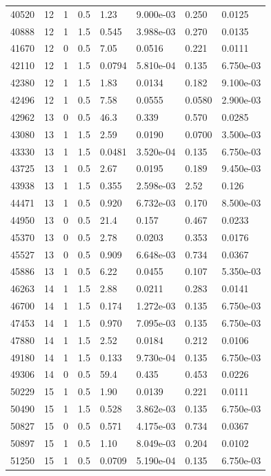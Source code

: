 \documentclass[preview]{standalone}
\begin{document}
{{{{\begin{tabular}{L{1.2cm}C{1.2cm} C{0.3cm}C{0.5cm} C{1.4cm}C{1.4cm} C{1.4cm}C{1.4cm}}
  40520  &    12  & 1     & 0.5 &  1.23  & 9.000e-03  & 0.250 &  0.0125   \\ 
  40888  &    12  & 1     & 1.5 &  0.545  & 3.988e-03  & 0.270 &  0.0135   \\ 
  41670  &    12  & 0     & 0.5 &  7.05  & 0.0516  & 0.221 &  0.0111   \\ 
  42110  &    12  & 1     & 1.5 &  0.0794  & 5.810e-04  & 0.135 &  6.750e-03   \\ 
  42380  &    12  & 1     & 1.5 &  1.83  & 0.0134  & 0.182 &  9.100e-03   \\ 
  42496  &    12  & 1     & 0.5 &  7.58  & 0.0555  & 0.0580 &  2.900e-03   \\ 
  42962  &    13  & 0     & 0.5 &  46.3  & 0.339  & 0.570 &  0.0285   \\ 
  43080  &    13  & 1     & 1.5 &  2.59  & 0.0190  & 0.0700 &  3.500e-03   \\ 
  43330  &    13  & 1     & 1.5 &  0.0481  & 3.520e-04  & 0.135 &  6.750e-03   \\ 
  43725  &    13  & 1     & 0.5 &  2.67  & 0.0195  & 0.189 &  9.450e-03   \\ 
  43938  &    13  & 1     & 1.5 &  0.355  & 2.598e-03  & 2.52 &  0.126   \\ 
  44471  &    13  & 1     & 0.5 &  0.920  & 6.732e-03  & 0.170 &  8.500e-03   \\ 
  44950  &    13  & 0     & 0.5 &  21.4  & 0.157  & 0.467 &  0.0233   \\ 
  45370  &    13  & 0     & 0.5 &  2.78  & 0.0203  & 0.353 &  0.0176   \\ 
  45527  &    13  & 0     & 0.5 &  0.909  & 6.648e-03  & 0.734 &  0.0367   \\ 
  45886  &    13  & 1     & 0.5 &  6.22  & 0.0455  & 0.107 &  5.350e-03   \\ 
  46263  &    14  & 1     & 1.5 &  2.88  & 0.0211  & 0.283 &  0.0141   \\ 
  46700  &    14  & 1     & 1.5 &  0.174  & 1.272e-03  & 0.135 &  6.750e-03   \\ 
  47453  &    14  & 1     & 1.5 &  0.970  & 7.095e-03  & 0.135 &  6.750e-03   \\ 
  47880  &    14  & 1     & 1.5 &  2.52  & 0.0184  & 0.212 &  0.0106   \\ 
  49180  &    14  & 1     & 1.5 &  0.133  & 9.730e-04  & 0.135 &  6.750e-03   \\ 
  49306  &    14  & 0     & 0.5 &  59.4  & 0.435  & 0.453 &  0.0226   \\ 
  50229  &    15  & 1     & 0.5 &  1.90  & 0.0139  & 0.221 &  0.0111   \\ 
  50490  &    15  & 1     & 1.5 &  0.528  & 3.862e-03  & 0.135 &  6.750e-03   \\ 
  50827  &    15  & 0     & 0.5 &  0.571  & 4.175e-03  & 0.734 &  0.0367   \\ 
  50897  &    15  & 1     & 0.5 &  1.10  & 8.049e-03  & 0.204 &  0.0102   \\ 
  51250  &    15  & 1     & 0.5 &  0.0709  & 5.190e-04  & 0.135 &  6.750e-03   \\ 
\hline 
\end{tabular} 

}}}}
\end{document}
